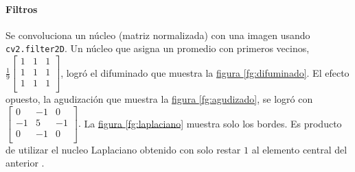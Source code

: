 \documentclass{article}
\begin{document}
\paragraph{Filtros} 
Se convoluciona un núcleo (matriz normalizada) con una imagen usando \verb'cv2.filter2D'.
Un núcleo que asigna un promedio con primeros vecinos, \(
\frac{1}{9} \left[ {\begin{array}{ccc}
	1 & 1 & 1 \\
	1 & 1 & 1 \\
	1 & 1 & 1 \\
\end{array} } \right]
\), logró el difuminado que muestra la \hyperref[fg:difuminado]{figura \ref*{fg:difuminado}}.
El efecto opuesto, la agudización que muestra la \hyperref[fg:agudizado]{figura \ref*{fg:agudizado}}, se logró con \(
\left[ {\begin{array}{ccc}
	0 & -1 & 0 \\
	-1 & 5 & -1 \\
	0 & -1 & 0 \\
\end{array} } \right].
\)
La \hyperref[fg:laplaciano]{figura \ref*{fg:laplaciano}} muestra solo los bordes.
Es producto de utilizar el nucleo Laplaciano obtenido con solo restar $1$ al elemento central del anterior \cite{noauthor_opencv_nodate-1}.
\end{document}
